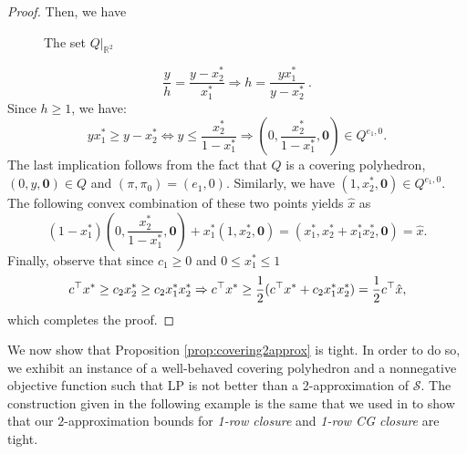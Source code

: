\documentclass[11pt]{article}
\newcommand{\R}{\mathbb{R}}
\renewcommand{\S}{\mathcal{S}}
\newcommand{\zeros}{\boldsymbol{0}}
\newcommand{\cred}{\color{black}}
\begin{document}
\begin{proof}
Then, we have
\begin{figure}[h]
\begin{center}
\end{center}
\caption{The set $Q |_{\R^2}$}
\label{fig:1pic}
\end{figure}

\begin{equation}
\label{eq:heq}
\frac{y}{h} = \frac{y - x^*_2}{x^*_1} \Rightarrow h = \frac{y x^*_1}{y-x^*_2} \ .
\end{equation}
{\cred Since $h \geq 1$, we have:}
$$y x^*_1 \geq y - x^*_2 \iff \displaystyle y \leq \frac{x^*_2}{1-x^*_1} 
\Rightarrow \displaystyle (0, \frac{x^*_2}{1-x^*_1},\zeros) \in Q^{e_1,0}.$$
The last implication follows from the fact that $Q$ is a covering polyhedron, $(0,y,\zeros) \in Q$ and $(\pi,\pi_0) = (e_1,0)$.
Similarly, we have $(1,x^*_2,\zeros) \in Q^{e_1,0}$. The following convex combination of these two points yields $\hat{x}$ as
$$(1-x^*_1) (0, \frac{x^*_2}{1-x^*_1},\zeros) + x^*_1 (1,x^*_2,\zeros) = (x^*_1,x^*_2 + x^*_1 x^*_2,\zeros) = \hat{x}.$$
Finally, observe that {\cred since $c_1 \geq 0$ and $0 \leq x^*_1 \leq 1$}
$${\cred c^\top x^* \geq c_2 x^*_2 \geq  c_2 x^*_1 x^*_2 \Rightarrow c^\top x^* \geq \frac{1}{2} (c^\top x^* + c_2 x^*_1 x^*_2) = \frac{1}{2}c^\top\hat{x}}, $$
which completes the proof.
\end{proof}
We now show that Proposition \ref{prop:covering2approx} is tight.
In order to do so, we exhibit an instance of a well-behaved covering polyhedron and a nonnegative objective function such that LP is not better than a 2-approximation of $\S$. The construction given in the following example is the same that we used in \cite{bodur2016aggregation}
to show that our $2$-approximation bounds for \emph{1-row closure} and \emph{1-row CG closure} are tight.
\end{document}
